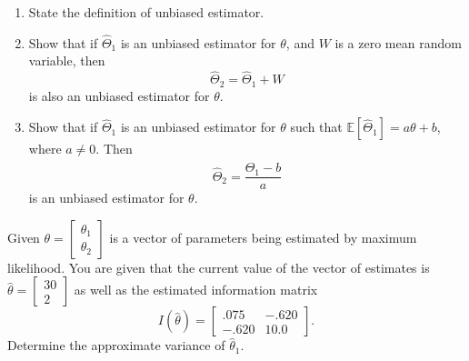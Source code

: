 \begin{mdframed}
    \begin{Exercise}
        \begin{enumerate}
            \item State the definition of unbiased estimator.
            \item Show that if $\widehat{\Theta}_1$ is an unbiased estimator for $\theta$, and $W$ is a zero mean random variable, then 
            \[
                \widehat{\Theta}_2 = \widehat{\Theta}_1 + W
            \]
            is also an unbiased estimator for $\theta$.
            \item Show that if $\widehat{\Theta}_1$ is an unbiased estimator for $\theta$ such that $\mathbb{E}[\widehat{\Theta}_1] = a\theta + b$, where $a \neq 0$. Then 
            \[
                \widehat{\Theta}_2 = \frac{\widehat{\Theta}_1 - b}{a}
            \]
            is an unbiased estimator for $\theta$.
        \end{enumerate}
    \end{Exercise}

    \begin{Exercise}
        Given $\theta = \begin{bmatrix}
            \theta_1 \\ \theta_2
        \end{bmatrix}$
        is a vector of parameters being estimated by maximum likelihood. You are 
        given that the current value of the vector of estimates is 
        $\widehat{\theta} = \begin{bmatrix}
            30 \\ 2
        \end{bmatrix}$ as well as the estimated information matrix 
        \[
            I(\widehat{\theta}) = \begin{bmatrix}
                .075 & -.620\\
                -.620 & 10.0
            \end{bmatrix}.
        \]
        Determine the approximate variance of $\widehat{\theta}_1$.
    \end{Exercise}
\end{mdframed}